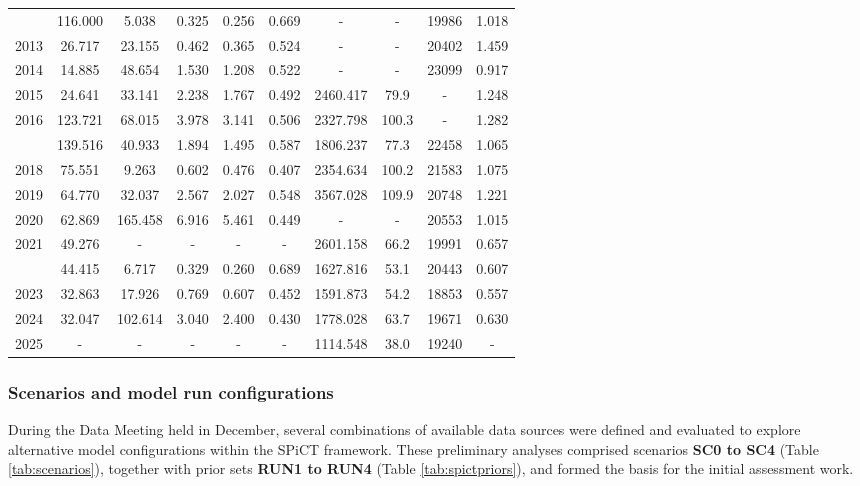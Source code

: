 \documentclass[
  12pt,
]{article}
\begin{document}
\begin{longtable}[t]{cccccccccc}
\addlinespace
2012 & 116.000 & 5.038 & 0.325 & 0.256 & 0.669 & - & - & 19986 & 1.018\\
2013 & 26.717 & 23.155 & 0.462 & 0.365 & 0.524 & - & - & 20402 & 1.459\\
2014 & 14.885 & 48.654 & 1.530 & 1.208 & 0.522 & - & - & 23099 & 0.917\\
2015 & 24.641 & 33.141 & 2.238 & 1.767 & 0.492 & 2460.417 & 79.9 & - & 1.248\\
2016 & 123.721 & 68.015 & 3.978 & 3.141 & 0.506 & 2327.798 & 100.3 & - & 1.282\\
\addlinespace
2017 & 139.516 & 40.933 & 1.894 & 1.495 & 0.587 & 1806.237 & 77.3 & 22458 & 1.065\\
2018 & 75.551 & 9.263 & 0.602 & 0.476 & 0.407 & 2354.634 & 100.2 & 21583 & 1.075\\
2019 & 64.770 & 32.037 & 2.567 & 2.027 & 0.548 & 3567.028 & 109.9 & 20748 & 1.221\\
2020 & 62.869 & 165.458 & 6.916 & 5.461 & 0.449 & - & - & 20553 & 1.015\\
2021 & 49.276 & - & - & - & - & 2601.158 & 66.2 & 19991 & 0.657\\
\addlinespace
2022 & 44.415 & 6.717 & 0.329 & 0.260 & 0.689 & 1627.816 & 53.1 & 20443 & 0.607\\
2023 & 32.863 & 17.926 & 0.769 & 0.607 & 0.452 & 1591.873 & 54.2 & 18853 & 0.557\\
2024 & 32.047 & 102.614 & 3.040 & 2.400 & 0.430 & 1778.028 & 63.7 & 19671 & 0.630\\
2025 & - & - & - & - & - & 1114.548 & 38.0 & 19240 & -\\*
\end{longtable}
\endgroup{}

\subsubsection{Scenarios and model run configurations}\label{scenarios-and-model-run-configurations}

\quad

During the Data Meeting held in December, several combinations of available data sources were defined and evaluated to explore alternative model configurations within the SPiCT framework. These preliminary analyses comprised scenarios \textbf{SC0 to SC4} (Table \ref{tab:scenarios}), together with prior sets \textbf{RUN1 to RUN4} (Table \ref{tab:spictpriors}), and formed the basis for the initial assessment work.
\end{document}
